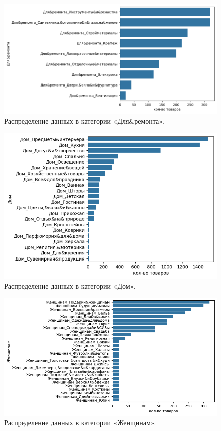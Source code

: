 \documentclass[a4paper,12pt]{extarticle}
\begin{document}
\begin{figure}[hbtp]
	\centering
	\includegraphics[scale=0.8]{приложения/amount_of_category_Для&ремонта.png}
	\caption{Распределение данных в категории «Для\&ремонта».}
	\label{fig:amount_of_category_Для&ремонта}
\end{figure}

\begin{figure}[hbtp]
	\centering
	\includegraphics[scale=0.8]{приложения/amount_of_category_Дом.png}
	\caption{Распределение данных в категории «Дом».}
	\label{fig:amount_of_category_Автотовары}
\end{figure}

\begin{figure}[hbtp]
	\centering
	\includegraphics[scale=0.8]{приложения/amount_of_category_Женщинам.png}
	\caption{Распределение данных в категории «Женщинам».}
	\label{fig:amount_of_category_Женщинам}
\end{figure}
\end{document}
